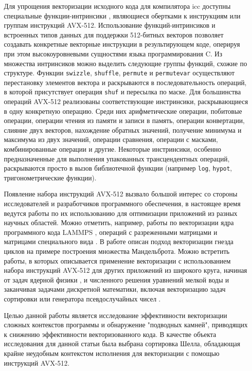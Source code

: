 \documentclass[utf8]{psta}
\begin{document}
Для упрощения векторизации исходного кода для компилятора icc доступны специальные функции-интринсики \cite{compiler_guide, intrinsic_guide}, являющиеся обертками к инструкциям или группам инструкций AVX-512. 
Использование функций-интринсиков и встроенных типов данных для поддержки 512-битных векторов позволяет создавать конкретные векторные инструкции в результирующем коде, оперируя при этом высокоуровневыми сущностями языка программирования C. 
Из множества интринсиков можно выделить следующие группы функций, схожие по структуре. Функции \texttt{swizzle}, \texttt{shuffle}, \texttt{permute} и \texttt{permutevar} осуществляют перестановку элементов вектора и раскрываются в последовательность операций, в которой присутствует операция \texttt{shuf} и пересылка по маске. Для большинства операций AVX-512 реализованы соответствующие инстринсики, раскрывающиеся в одну конкретную операцию. 
Среди них арифметические операции, побитовые операции, операции чтения из памяти и записи в память, операции конвертации, слияние двух векторов, нахождение обратных значений, получение минимума и максимума из двух значений, операции сравнения, операции с масками, комбинированные операции и другие. 
Некоторые инстринсики, особенно предназначенные для выполнения упакованных трансцендентных операций, раскрываются просто в вызов библиотечной функции (например \texttt{log}, \texttt{hypot}, тригонометрические функции).

Появление набора инструкций AVX-512 вызвало большой интерес со стороны исследователей и разработчиков программного обеспечения, в настоящее время ведутся работы по их использованию для оптимизации приложений из разных научных областей.
Можно отметить, например, работы по векторизации ядра программного кода LAMMPS \cite{McDoniel}, операций с разреженными матрицами \cite{Malas} и матрицами специального вида \cite{Benderskij}.
В работе \cite{Krzikalla} описан подход векторизации гнезда циклов на примере построения множества Мандельброта.
Можно встретить работы, в которых описывается применение векторизации с использованием набора инструкций AVX-512 для других приложений из широкого круга, начиная от задач ядерной физики \cite{Cook}, и численного решения уравнений мелкой воды \cite{Ferreira} и заканчивая задачами дискретной математики, включая векторизацию задач сортировки \cite{Bramas} или генератора псевдослучайных чисел \cite{Guskova}.

Целью данной работы является исследование эффективности векторизации сложных контекстов программы и обнаружение "подводных камней", приводящих к снижению эффективности векторизованного кода. 
В качестве объекта исследования для данной статьи была выбрана сортировка Шелла, обладающая крайне неудобным контекстом исполнения для векторизации с помощью инструкций AVX-512.
\end{document}
